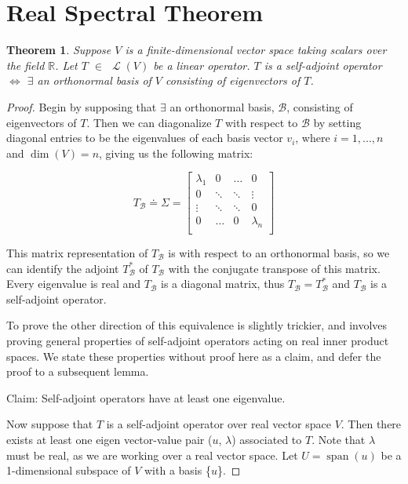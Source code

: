 \documentclass[letterpaper,12pt]{article}
\newtheorem{theorem}{Theorem}[section]
\begin{document}
\section{Real Spectral Theorem}
\begin{theorem}
Suppose $V$ is a finite-dimensional vector space taking scalars over the field 
$\mathbb{R}$. Let $T$ $\in$ $\operatorname{\mathcal{L}}(V)$ be a linear operator. $T$ is a self-adjoint operator $\Longleftrightarrow$ $\exists$ an orthonormal basis of $V$ consisting of eigenvectors of $T$.
\end{theorem}

\begin{proof}
Begin by supposing that $\exists$ an orthonormal basis, $\mathcal{B}$, consisting of eigenvectors of $T$. Then we can diagonalize $T$ with respect to $\mathcal{B}$ by setting diagonal entries to be the eigenvalues of each basis vector $v_i$, where $i = 1, ..., n$ and $\operatorname{dim}(V) = n$, giving us the following matrix:

\[
T_{\mathcal{B}} \doteq \Sigma =\begin{bmatrix}
    \lambda_{1} & 0 & \dots & 0 \\
    0 & \ddots & \ddots & \vdots \\
    \vdots & \ddots & \ddots & 0 \\
    0 & \dots & 0 & \lambda_{n}\\
    \end{bmatrix}
\]

This matrix representation of $T_{\mathcal{B}}$ is with respect to an orthonormal basis, so we can identify the adjoint $T_{\mathcal{B}}^{*}$ of $T_{\mathcal{B}}$ with the conjugate transpose of this matrix. Every eigenvalue is real and $T_{\mathcal{B}}$ is a diagonal matrix, thus $T_{\mathcal{B}} = T_{\mathcal{B}}^{*}$ and $T_{\mathcal{B}}$ is a self-adjoint operator.

To prove the other direction of this equivalence is slightly trickier, and involves proving general properties of self-adjoint operators acting on real inner product spaces. We state these properties without proof here as a claim, and defer the proof to a subsequent lemma.

\theoremstyle{remark}
\begin{remark}{Claim:}
Self-adjoint operators have at least one eigenvalue.
\end{remark}

Now suppose that $T$ is a self-adjoint operator over real vector space $V$. Then there exists at least one eigen vector-value pair ($u$, $\lambda$) associated to $T$. Note that $\lambda$ must be real, as we are working over a real vector space. Let $U = \operatorname{span}(u)$ be a 1-dimensional subspace of $V$ with a basis \{$u$\}.


\end{proof}
\end{document}
